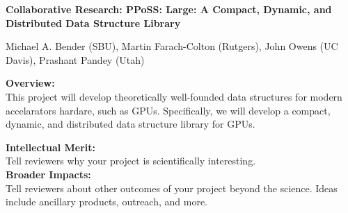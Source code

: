 \begin{center}
\bf
\Large
Collaborative Research: PPoSS: Large: A Compact, Dynamic, and Distributed Data
Structure Library

\medskip
\small
Michael A. Bender (SBU), Martin Farach-Colton (Rutgers), John Owens (UC Davis),
Prashant Pandey (Utah)
\end{center}


\noindent \textbf{\large Overview:}\\

\noindent This project will develop theoretically well-founded data structures for modern accelarators hardare, such as GPUs. Specifically, we will develop a compact, dynamic, and distributed data structure library for GPUs.


\noindent \textbf{\large Intellectual Merit:}\\

\noindent Tell reviewers why your project is scientifically interesting.\\

\noindent \textbf{\large Broader Impacts: }\\

\noindent Tell reviewers about other outcomes of your project beyond the science. Ideas include ancillary products, outreach, and more.
